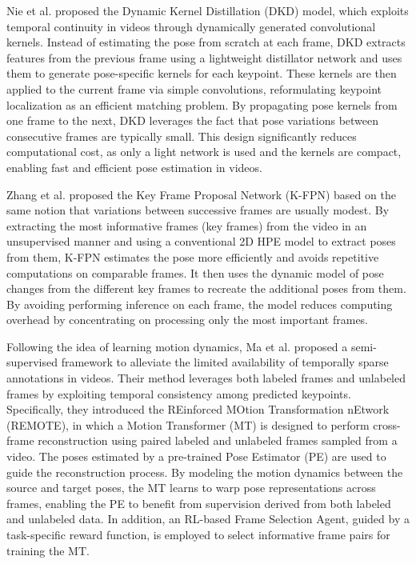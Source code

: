 Nie et al. \cite{nie2019dynamic} proposed the Dynamic Kernel Distillation (DKD) model, which exploits temporal continuity in videos through dynamically generated convolutional kernels. Instead of estimating the pose from scratch at 
each frame, DKD extracts features from the previous frame using a lightweight distillator network and uses them to generate pose-specific kernels for each keypoint. These kernels are then applied to the current frame via simple 
convolutions, reformulating keypoint localization as an efficient matching problem. By propagating pose kernels from one frame to the next, DKD leverages the fact that pose variations between consecutive frames are typically small. 
This design significantly reduces computational cost, as only a light network is used and the kernels are compact, enabling fast and efficient pose estimation in videos.

Zhang et al. \cite{zhang2020key} proposed the Key Frame Proposal Network (K-FPN) based on the same notion that variations between successive frames are usually modest. By extracting the most informative frames (key frames) from the video in an 
unsupervised manner and using a conventional 2D HPE model to extract poses from them, K-FPN estimates the pose more efficiently and avoids repetitive computations on comparable frames. It then uses the dynamic model of pose changes 
from the different key frames to recreate the additional poses from them. By avoiding performing inference on each frame, the model reduces computing overhead by concentrating on processing only the most important frames.

Following the idea of learning motion dynamics, Ma et al. \cite{ma2022remote} proposed a semi-supervised framework to alleviate the limited availability of temporally sparse annotations in videos. Their method leverages both labeled 
frames and unlabeled frames by exploiting temporal consistency among predicted keypoints. Specifically, they introduced the REinforced MOtion Transformation nEtwork (REMOTE), in which a Motion Transformer (MT) is designed to perform 
cross-frame reconstruction using paired labeled and unlabeled frames sampled from a video. The poses estimated by a pre-trained Pose Estimator (PE) are used to guide the reconstruction process. By modeling the motion dynamics between 
the source and target poses, the MT learns to warp pose representations across frames, enabling the PE to benefit from supervision derived from both labeled and unlabeled data. In addition, an RL-based Frame Selection Agent, guided by 
a task-specific reward function, is employed to select informative frame pairs for training the MT.

